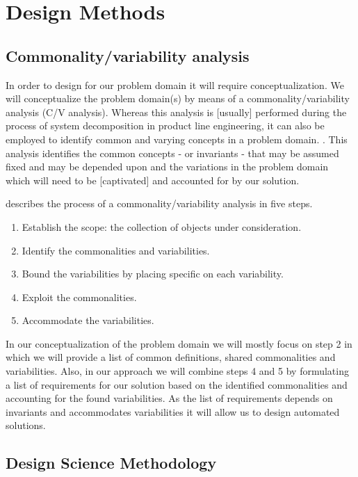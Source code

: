 \section{Design Methods}
\subsection{Commonality/variability analysis}
\label{sec:back:cv_analysis}
In order to design for our problem domain it will require conceptualization. We will conceptualize the problem domain(s) by means of a commonality/variability analysis (C/V analysis). Whereas this analysis is [usually] performed during the process of system decomposition in product line engineering, it can also be employed to identify common and varying concepts in a problem domain. \cite{cva_problem_domain}.  This analysis identifies the common concepts - or invariants - that may be assumed fixed and may be depended upon and the variations in the problem domain which will need to be [captivated] and accounted for by our solution.

\cite{cv_analysis} describes the process of a commonality/variability analysis in five steps.

\begin{enumerate}
\nospace
\item Establish the scope: the collection of objects
under consideration.
\item Identify the commonalities and variabilities.
\item Bound the variabilities by placing specific on each variability.
\item Exploit the commonalities.
\item Accommodate the variabilities.
\end{enumerate}

In our conceptualization of the problem domain we will mostly focus on step 2 in which we will provide a list of common definitions, shared commonalities and variabilities. Also, in our approach we will combine steps 4 and 5 by formulating a list of requirements for our solution based on the identified commonalities and accounting for the found variabilities. As the list of requirements depends on invariants and accommodates variabilities it will allow us to design automated solutions.

\subsection{Design Science Methodology}
\label{sec:back:dsm}
